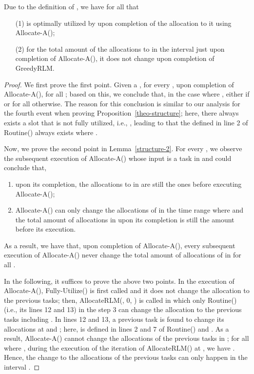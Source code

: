 \documentclass[10pt,journal,compsoc]{IEEEtran}
\begin{document}
\begin{lemma}\label{structure-2}
Due to the definition of , we have for all  that
\begin{itemize}
 \setlength\itemsep{0.25em}
\item [(1)]  is optimally utilized by  upon completion of the allocation to it using Allocate-A();
\item [(2)] for the total amount of the allocations to  in the interval  just upon completion of Allocate-A(), it does not change upon completion of GreedyRLM.
\end{itemize}
\end{lemma}
\begin{proof}
We first prove the first point. Given a , for every , upon completion of Allocate-A(),  for all ; based on this, we conclude that, in the case where , either  if  or  for all  otherwise. The reason for this conclusion is similar to our analysis for the fourth event when proving Proposition~\ref{theo-structure}; here, there always exists a slot  that is not fully utilized, i.e., , leading to that the  defined in line 2 of Routine() always exists where .




Now, we prove the second point in Lemma~\ref{structure-2}. For every , we observe the subsequent execution of Allocate-A() whose input is a task in  and could conclude that,
\begin{enumerate}
 \setlength\itemsep{0.2em}

\item upon its completion, the allocations to  in  are still the ones before executing Allocate-A();

\item Allocate-A() can only change the allocations of  in the time range  where  and the total amount of allocations in  upon its completion is still the amount before its execution.
\end{enumerate}
As a result, we have that, upon completion of Allocate-A(), every subsequent execution of Allocate-A() never change the total amount of allocations of  in  for all . 

In the following, it suffices to prove the above two points. In the execution of Allocate-A(), Fully-Utilize() is first called and it does not change the allocation to the previous tasks; then, AllocateRLM(, 0, ) is called in which only Routine() (i.e., its lines 12 and 13) in the step 3 can change the allocation to the previous tasks including . In lines 12 and 13, a previous task  is found to change its allocations at  and ; here,  is defined in lines 2 and 7 of Routine() and . As a result, Allocate-A() cannot change the allocations of the previous tasks in ; for all  where , during the execution of the iteration of AllocateRLM() at , we have . Hence, the change to the allocations of the previous tasks can only happen in the interval .
\end{proof}
\end{document}
